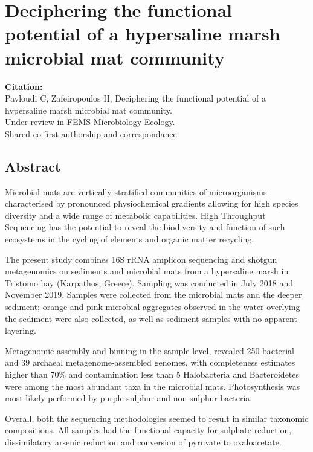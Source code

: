 % 
% 

\chapter{
   Deciphering the functional potential of a hypersaline marsh microbial mat community
}
\label{publ:swamp}

\textbf{Citation:} \\ 
   Pavloudi C, Zafeiropoulos H, 
   Deciphering the functional potential of a hypersaline marsh microbial mat community.\\
   Under review in FEMS Microbiology Ecology. \\ 
   Shared co-first authorship and correspondance.


\section{Abstract}

   Microbial mats are vertically stratified communities of microorganisms characterised by 
   pronounced physiochemical gradients allowing for high species diversity 
   and a wide range of metabolic capabilities. 
   High Throughput Sequencing has the potential to reveal the biodiversity and function of such ecosystems 
   in the cycling of elements and organic matter recycling.

   The present study combines 16S rRNA amplicon sequencing and shotgun metagenomics 
   on sediments and microbial mats from a hypersaline marsh in Tristomo bay 
   (Karpathos, Greece). 
   Sampling was conducted in July 2018 and November 2019. 
   Samples were collected from the microbial mats and the deeper sediment; 
   orange and pink microbial aggregates observed in the water overlying the 
   sediment were also collected, as well as sediment samples with no apparent layering.

   Metagenomic assembly and binning in the sample level, revealed 250 bacterial 
   and 39 archaeal metagenome-assembled genomes, 
   with completeness estimates higher than 70\%  and contamination less than 5%
   Halobacteria and Bacteroidetes were among the most abundant taxa in the microbial mats. 
   Photosynthesis was most likely performed by purple sulphur and non-sulphur bacteria. 
   
   Overall, both the sequencing methodologies seemed to result in similar 
   taxonomic compositions. 
   All samples had the functional capacity for sulphate reduction, 
   dissimilatory arsenic reduction and conversion of pyruvate to oxaloacetate. 



